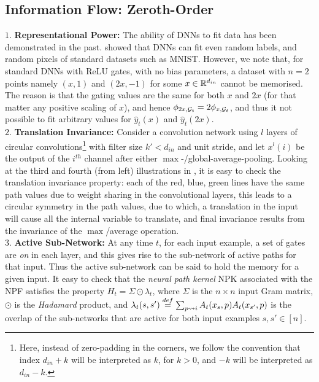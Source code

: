 \subsection{Information Flow: Zeroth-Order}
$1.$ \textbf{Representational Power:} The ability of DNNs to fit data has been demonstrated in the past. \cite{ben} showed that DNNs can fit even random labels, and random pixels of standard datasets such as MNIST. However, we note that, for standard DNNs with ReLU gates, with no bias parameters, a dataset with $n=2$ points namely $(x,1)$ and $(2x,-1)$ for some $x\in \mathbb{R}^{d_{in}}$ cannot be memorised. The reason is that the gating values are the same for both $x$ and $2x$ (for that matter any positive scaling of $x$), and hence $\phi_{2x,\mathcal{G}_t }= 2\phi_{x,\mathcal{G}_t }$, and thus it not possible to fit arbitrary values for $\hat{y}_t(x)$ and $\hat{y}_t(2x)$.\\
$2.$ \textbf{Translation Invariance:} Consider a convolution network using $l$ layers of circular convolutions\footnote{Here, instead of zero-padding in the corners, we follow the convention that index $d_{in}+k$ will be interpreted as $k$, for $k>0$, and $-k$ will be interpreted as $d_{in}-k$.} with filter size $k'<d_{in}$ and unit stride, and let $x^l(i)$ be the output of the $i^{th}$ channel after either $\max$-/global-average-pooling. Looking at the third and fourth (from left) illustrations in , it is easy to check the translation invariance property: each of the red, blue, green lines have the same path values due to weight sharing in the convolutional layers, this leads to a circular symmetry in the path values, due to which, a translation in the input will cause all the internal variable to translate, and final invariance results from the invariance of the $\max$/average operation.\\
$3.$ \textbf{Active Sub-Network:} At any time $t$, for each input example, a set of gates are \emph{on} in each layer, and this gives rise to the sub-network of active paths for that input. Thus the active sub-network can be said to hold the memory for a given input. It easy to check that the \emph{neural path kernel} NPK associated with the NPF satisfies the property $H_t=\Sigma\odot \lambda_t$, where $\Sigma$ is the $n\times n$ input Gram matrix, $\odot$ is the \emph{Hadamard} product, and $\lambda_t(s,s')\stackrel{def}{=}\sum_{p\rightsquigarrow i} A_t(x_s,p) A_t(x_{s'},p)$ is the overlap of the sub-networks that are active for both input examples $s,s'\in[n]$.
